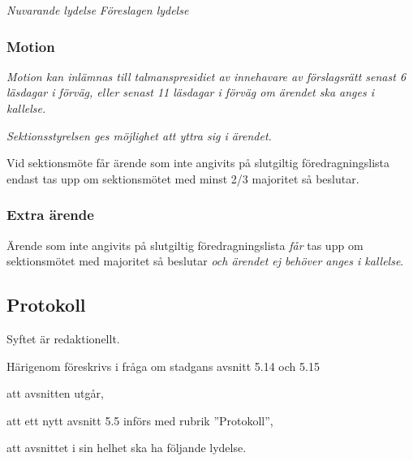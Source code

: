 \documentclass{article}
\newenvironment{lydelse}
    {\begin{paracol}{2}%
        \emph{Nuvarande lydelse}%
        \switchcolumn%
        \emph{Föreslagen lydelse}%
    \end{paracol}%
    \begin{enumerate}[label=\thesubsection.\arabic*]%
    \begin{paracol}{2}%
    }{\end{paracol}\end{enumerate}}
\begin{document}
\begin{lydelse}
  \switchcolumn
  \subsubsection*{Motion}
  \item \emph{Motion kan inlämnas till talmanspresidiet av innehavare av förslagsrätt senast 6 läsdagar i förväg, eller senast 11 läsdagar i förväg om ärendet ska anges i kallelse.}
  \item \emph{Sektionsstyrelsen ges möjlighet att yttra sig i ärendet.}
 
  \switchcolumn*
  \setcounter{subsection}{18} 
  \setcounter{enumi}{0}
  \item Vid sektionsmöte får ärende som inte angivits på slutgiltig
  före\-drag\-nings\-lista endast tas upp om sektionsmötet med minst 2/3 majoritet så beslutar.
  
  \switchcolumn
  \subsubsection*{Extra ärende}
  \item Ärende som inte angivits på slutgiltig föredragningslista \emph{får} tas upp om sektionsmötet med  majoritet så beslutar \emph{och ärendet ej behöver anges i kallelse}. \label{maj:eä}
\end{lydelse}

\setcounter{subsection}{4}
\subsection{Protokoll}
Syftet är redaktionellt.

Härigenom föreskrivs i fråga om stadgans avsnitt 5.14 och 5.15
\begin{dels}
\item att avsnitten utgår,
\item att ett nytt avsnitt 5.5 införs med rubrik ''Protokoll'',
\item att avsnittet i sin helhet ska ha följande lydelse.
\end{dels}
\end{document}

